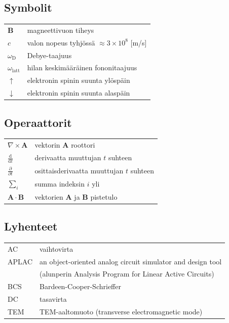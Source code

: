\documentclass[finnish, 12pt, a4paper, elec, utf8, a-2b, online]{aaltothesis}
\begin{document}
\newpage



\thesistableofcontents



\subsection*{Symbolit}

\begin{tabular}{ll}
$\mathbf{B}$  & magneettivuon tiheys  \\
$c$              & valon nopeus tyhjössä $\approx 3\times10^8$ [m/s]\\
$\omega_{\mathrm{D}}$    & Debye-taajuus \\
$\omega_{\mathrm{latt}}$ & hilan keskimääräinen fononitaajuus \\
$\uparrow$       & elektronin spinin suunta ylöspäin\\
$\downarrow$     & elektronin spinin suunta alaspäin
\end{tabular}

\subsection*{Operaattorit}

\begin{tabular}{ll}
$\nabla \times \mathbf{A}$              & vektorin $\mathbf{A}$ roottori\\
$\displaystyle\frac{\mbox{d}}{\mbox{d} t}$ & derivaatta muuttujan $t$ 
suhteen\\[3mm]
$\displaystyle\frac{\partial}{\partial t}$  & osittaisderivaatta muuttujan $t$ 
suhteen \\[3mm]
$\sum_i $                       & summa indeksin $i$ yli\\
$\mathbf{A} \cdot \mathbf{B}$    & vektorien $\mathbf{A}$ ja $\mathbf{B}$ 
pistetulo
\end{tabular}

\subsection*{Lyhenteet}

\begin{tabular}{ll}
AC         & vaihtovirta \\
APLAC      & an object-oriented analog circuit simulator and design tool \\
           & (alunperin Analysis Program for Linear Active Circuits) \\
BCS        & Bardeen-Cooper-Schrieffer \\ %
DC         & tasavirta \\
TEM        & TEM-aaltomuoto (transverse electromagnetic mode)
\end{tabular}
\end{document}
